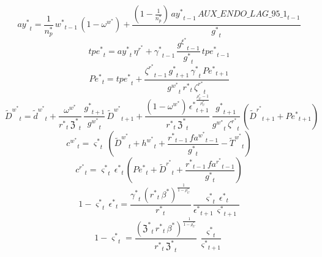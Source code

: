 \begin{dmath}
{{ay^*}}_{t}=\frac{1}{{{n_p^*}}}\, {{w^*}}_{t-1}\, \left(1-{{\omega^w^*}}\right)+\frac{\left(1-\frac{1}{{{n_p^*}}}\right)\, {{ay^*}}_{t-1}\, {AUX\_ENDO\_LAG\_95\_1}_{t-1}}{{{g^*}}_{t}}
\end{dmath}
\begin{dmath}
{{tpe^*}}_{t}={{ay^*}}_{t}\, {{\eta^r^*}}+{{\gamma^*}}_{t-1}\, \frac{{{g^{\xi}^*}}_{t-1}}{{{g^*}}_{t}}\, {{tpe^*}}_{t-1}
\end{dmath}
\begin{dmath}
{{Pe^*}}_{t}={{tpe^*}}_{t}+\frac{{{\zeta^r^*}}_{t-1}\, {{g^*}}_{t+1}\, {{\gamma^*}}_{t}\, {{Pe^*}}_{t+1}}{{{g^w^*}}_{t}\, {{r^*}}_{t}\, {{\zeta^r^*}}_{t}}
\end{dmath}
\begin{dmath}
{\tilde{D}^w^*}_{t}={\tilde{d}^w^*}_{t}+\frac{{{\omega^w^*}}}{{{r^*}}_{t}\, {{\mathfrak{Z}^*}}_{t}}\, \frac{{{g^*}}_{t+1}}{{{g^w^*}}_{t}}\, {\tilde{D}^w^*}_{t+1}+\frac{\left(1-{{\omega^w^*}}\right)\, {{\epsilon^*}}_{t+1}^{\frac{{{\rho_U^*}}-1}{{{\rho_U^*}}}}}{{{r^*}}_{t}\, {{\mathfrak{Z}^*}}_{t}}\, \frac{{{g^*}}_{t+1}}{{{g^w^*}}_{t}\, {{\zeta^r^*}}_{t}}\, \left({\tilde{D}^r^*}_{t+1}+{{Pe^*}}_{t+1}\right)
\end{dmath}
\begin{dmath}
{{c^w^*}}_{t}={{\varsigma^*}}_{t}\, \left({\tilde{D}^w^*}_{t}+{{h^w^*}}_{t}+\frac{{{r^*}}_{t-1}\, {{fa^w^*}}_{t-1}}{{{g^*}}_{t}}-{\tilde{T}^w^*}_{t}\right)
\end{dmath}
\begin{dmath}
{{c^r^*}}_{t}={{\varsigma^*}}_{t}\, {{\epsilon^*}}_{t}\, \left({{Pe^*}}_{t}+{\tilde{D}^r^*}_{t}+\frac{{{r^*}}_{t-1}\, {{fa^r^*}}_{t-1}}{{{g^*}}_{t}}\right)
\end{dmath}
\begin{dmath}
1-{{\varsigma^*}}_{t}\, {{\epsilon^*}}_{t}=\frac{{{\gamma^*}}_{t}\, \left({{r^*}}_{t}\, {{\beta^*}}\right)^{\frac{1}{1-{{\rho_U^*}}}}}{{{r^*}}_{t}}\, \frac{{{\varsigma^*}}_{t}\, {{\epsilon^*}}_{t}}{{{\epsilon^*}}_{t+1}\, {{\varsigma^*}}_{t+1}}
\end{dmath}
\begin{dmath}
1-{{\varsigma^*}}_{t}=\frac{\left({{\mathfrak{Z}^*}}_{t}\, {{r^*}}_{t}\, {{\beta^*}}\right)^{\frac{1}{1-{{\rho_U^*}}}}}{{{r^*}}_{t}\, {{\mathfrak{Z}^*}}_{t}}\, \frac{{{\varsigma^*}}_{t}}{{{\varsigma^*}}_{t+1}}
\end{dmath}

